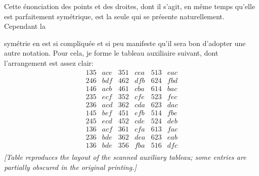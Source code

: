 \documentclass[11pt]{article}
\begin{document}
\medskip
Cette \'enonciation des points et des droites, dont il s'agit, en m\^eme temps qu'elle
est parfaitement sym\'etrique, est la seule qui se pr\'esente naturellement. Cependant la

\bigskip

\noindent sym\'etrie en est si compliqu\'ee et si peu manifeste qu'il sera bon d'adopter une autre
notation. Pour cela, je forme le tableau auxiliaire suivant, dont l'arrangement est assez
clair:
\[
\begin{array}{cccccc}
135 & ace & 351 & cea & 513 & eac\\
246 & bdf & 462 & dfb & 624 & fbd\\
146 & acb & 461 & cba & 614 & bac\\
235 & ecf & 352 & cfe & 523 & fec\\
236 & acd & 362 & cda & 623 & dac\\
145 & bef & 451 & efb & 514 & fbe\\
245 & ecd & 452 & cde & 524 & deb\\
136 & acf & 361 & cfa & 613 & fac\\
236 & bde & 362 & dea & 623 & eab\\
136 & bde & 356 & fba & 516 & dfc\\
\end{array}
\]
\textit{[Table reproduces the layout of the scanned auxiliary tableau; some entries are partially obscured in the original printing.]}
\end{document}
